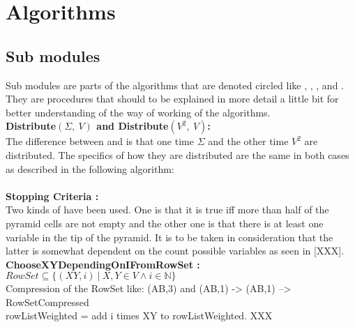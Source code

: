 
\section{Algorithms}\label{algorithms}
\subsection{Sub modules}
Sub modules are parts of the algorithms that are denoted circled like , , ,  and . They are procedures that should to be explained in more detail a little bit for better understanding of the way of working of the algorithms.\\

\noindent \textbf{Distribute$(\Sigma,\ V) $ and Distribute$(V^2,\ V)$:}\\
The difference between  and  is that one time $\Sigma$ and the other time $V^2$ are distributed. The specifics of how they are distributed are the same in both cases as described in the following algorithm: \\

\noindent
{} \\

\noindent \textbf{Stopping Criteria :}\\
Two kinds of  have been used. One is that it is true iff more than half of the pyramid cells are not empty and the other one is that there is at least one variable in the tip of the pyramid. It is to be taken in consideration that the latter is somewhat dependent on the count possible variables as seen in [XXX]. \\

\noindent \textbf{ChooseXYDependingOnIFromRowSet :}\\
$RowSet \subseteq \{(XY,i)\ |\ X,Y \in V \wedge i \in \mathbb{N} \}$\\
Compression of the RowSet like: (AB,3) and (AB,1) -> (AB,1) --> RowSetCompressed\\
rowListWeighted = add i times XY to rowListWeighted. XXX\\

